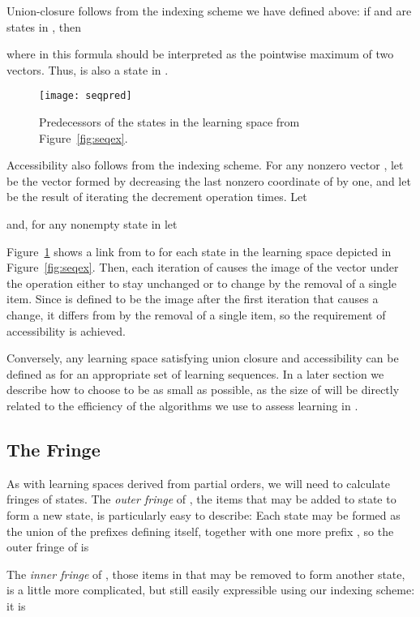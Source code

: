 \documentclass[11pt]{llncs}
\begin{document}
{Union-closure follows from the indexing scheme we have defined above:
if  and  are states in , then

where in this formula  should be interpreted as the pointwise maximum of two vectors.
Thus,  is also a state in .

\begin{figure}[t]
\centering\texttt{[image: seqpred]}
\caption{Predecessors of the states in the learning space from Figure~\ref{fig:seqex}.}
\label{fig:seqpred}
\end{figure}

Accessibility also follows from the indexing scheme.
For any nonzero vector , let  be the vector formed by decreasing the last nonzero coordinate of  by one, and let  be the result of iterating the decrement operation  times. Let
 
and, for any nonempty state  in 
let

Figure~\ref{fig:seqpred} shows a link from  to  for each state  in the learning space depicted in Figure~\ref{fig:seqex}.
Then, each iteration of  causes the image of the vector under the  operation either to stay unchanged or to change by the removal of a single item. Since  is defined to be the image after the first iteration that causes a change, it differs from  by the removal of a single item, so the requirement of accessibility is achieved.

Conversely, any learning space satisfying union closure and accessibility can be defined as  for an appropriate set  of learning sequences. In a later section we describe how to choose  to be as small as possible, as the size of  will be directly related to the efficiency of the algorithms we use to assess learning in .

\subsection{The Fringe}

As with learning spaces derived from partial orders, we will need to calculate fringes of states.
The \emph{outer fringe} of , the items that may be added to state  to form a new state,
is particularly easy to describe: Each state  may be formed as the union of the prefixes defining  itself, together
with one more prefix , so the outer fringe of  is

The \emph{inner fringe} of , those items in  that may be removed to form another state,
is a little more complicated, but still easily expressible using our indexing scheme: it is

}
\end{document}
